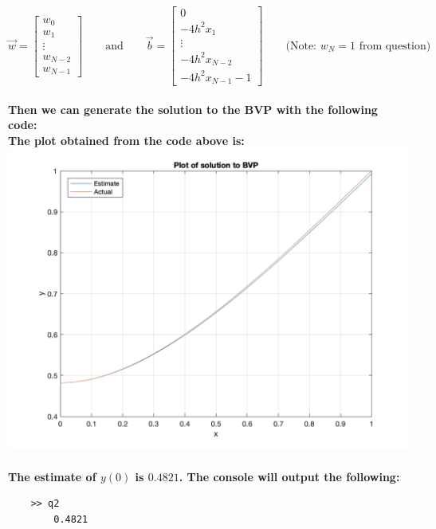 \documentclass[11pt]{article}
\begin{document}
\[ \vec{w} = \begin{bmatrix}
	w_0\\
	w_1\\
	\vdots\\
	w_{N-2}\\
	w_{N-1}
\end{bmatrix}\qquad \text{and}\qquad
\vec{b} = \begin{bmatrix}
	0\\
	-4h^2x_1\\
	\vdots\\
	-4h^2x_{N-2}\\
	-4h^2x_{N-1} - 1
\end{bmatrix} \qquad \text{(Note: $w_N = 1$ from question)}\]\pagebreak\\
\textbf{Then we can generate the solution to the BVP with the following code:}\\


\textbf{The plot obtained from the code above is:}\\
\includegraphics[width=\linewidth]{plot_y.png}\\\\

\textbf{The estimate of $y(0)$ is $\boxed{0.4821}$. The console will output the following:}
\begin{verbatim}
    >> q2
        0.4821
\end{verbatim}
\end{document}
